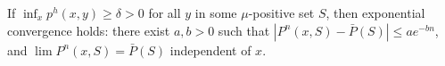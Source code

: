 If $\inf_x p^h(x, y) \geq \delta > 0$ for all $y$ in some $\mu$-positive set $S$, then exponential convergence holds: there exist $a, b > 0$ such that $|P^n(x, S) - \bar{P}(S)| \leq ae^{-bn}$, and $\lim P^n(x, S) = \bar{P}(S)$ independent of $x$.
